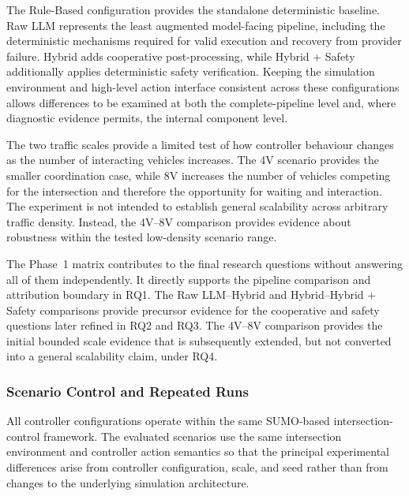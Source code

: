 \documentclass[letterpaper,10pt,conference]{ieeeconf}
\begin{document}
The Rule-Based configuration provides the standalone deterministic baseline. Raw LLM represents the least augmented model-facing pipeline, including the deterministic mechanisms required for valid execution and recovery from provider failure. Hybrid adds cooperative post-processing, while Hybrid + Safety additionally applies deterministic safety verification. Keeping the simulation environment and high-level action interface consistent across these configurations allows differences to be examined at both the complete-pipeline level and, where diagnostic evidence permits, the internal component level.



The two traffic scales provide a limited test of how controller behaviour changes as the number of interacting vehicles increases. The 4V scenario provides the smaller coordination case, while 8V increases the number of vehicles competing for the intersection and therefore the opportunity for waiting and interaction. The experiment is not intended to establish general scalability across arbitrary traffic density. Instead, the 4V--8V comparison provides evidence about robustness within the tested low-density scenario range.



The Phase~1 matrix contributes to the final research questions without answering all of them independently. It directly supports the pipeline comparison and attribution boundary in RQ1. The Raw LLM--Hybrid and Hybrid--Hybrid + Safety comparisons provide precursor evidence for the cooperative and safety questions later refined in RQ2 and RQ3. The 4V--8V comparison provides the initial bounded scale evidence that is subsequently extended, but not converted into a general scalability claim, under RQ4.



\subsubsection{Scenario Control and Repeated Runs}



All controller configurations operate within the same SUMO-based intersection-control framework. The evaluated scenarios use the same intersection environment and controller action semantics so that the principal experimental differences arise from controller configuration, scale, and seed rather than from changes to the underlying simulation architecture.
\end{document}
